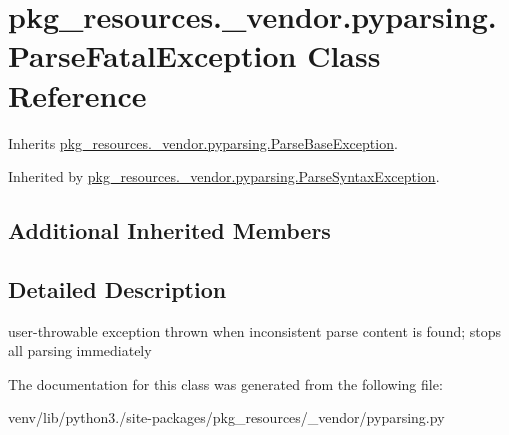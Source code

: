 \hypertarget{classpkg__resources_1_1__vendor_1_1pyparsing_1_1_parse_fatal_exception}{}\section{pkg\+\_\+resources.\+\_\+vendor.\+pyparsing.\+Parse\+Fatal\+Exception Class Reference}
\label{classpkg__resources_1_1__vendor_1_1pyparsing_1_1_parse_fatal_exception}


Inherits \hyperlink{classpkg__resources_1_1__vendor_1_1pyparsing_1_1_parse_base_exception}{pkg\+\_\+resources.\+\_\+vendor.\+pyparsing.\+Parse\+Base\+Exception}.



Inherited by \hyperlink{classpkg__resources_1_1__vendor_1_1pyparsing_1_1_parse_syntax_exception}{pkg\+\_\+resources.\+\_\+vendor.\+pyparsing.\+Parse\+Syntax\+Exception}.

\subsection*{Additional Inherited Members}


\subsection{Detailed Description}
\begin{DoxyVerb}user-throwable exception thrown when inconsistent parse content
   is found; stops all parsing immediately\end{DoxyVerb}
 

The documentation for this class was generated from the following file\+:\begin{DoxyCompactItemize}
\item 
venv/lib/python3./site-\/packages/pkg\+\_\+resources/\+\_\+vendor/pyparsing.\+py\end{DoxyCompactItemize}
